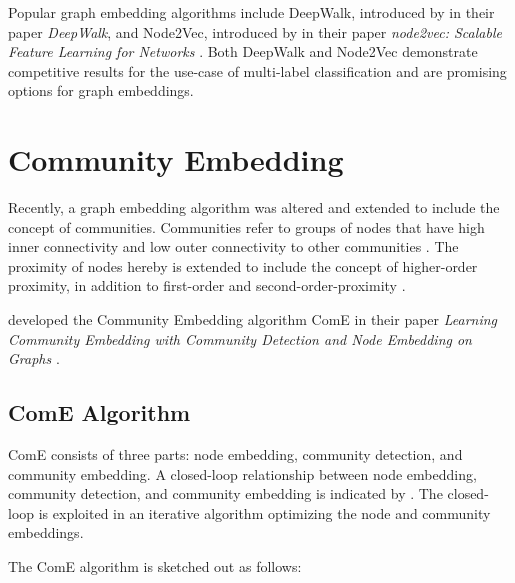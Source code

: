 \documentclass[conference]{IEEEtran}
\begin{document}
Popular graph embedding algorithms include DeepWalk, introduced by \citeauthor{Perozzi2014DeepWalkOL} in their \citeyear{Perozzi2014DeepWalkOL} paper \textit{DeepWalk}, and Node2Vec, introduced by \citeauthor{Grover2016node2vecSF} in their \citeyear{Grover2016node2vecSF} paper \textit{node2vec: Scalable Feature Learning for Networks} \cite{Perozzi2014DeepWalkOL, Grover2016node2vecSF}. Both DeepWalk and Node2Vec demonstrate competitive results for the use-case of multi-label classification and are promising options for graph embeddings.

\section{Community Embedding}

Recently, a graph embedding algorithm was altered and extended to include the concept of communities. Communities refer to groups of nodes that have high inner connectivity and low outer connectivity to other communities \cite{ComE}. The proximity of nodes hereby is extended to include the concept of higher-order proximity, in addition to first-order and second-order-proximity \cite{ComE}.

\citeauthor{ComE} developed the Community Embedding algorithm ComE in their \citeyear{ComE} paper \textit{Learning Community Embedding with Community Detection and Node Embedding on Graphs} \cite{ComE}.

\subsection{ComE Algorithm}
\label{sec:ComE_alg}

ComE consists of three parts: node embedding, community detection, and community embedding. A closed-loop relationship between node embedding, community detection, and community embedding is indicated by \citeauthor{ComE}. The closed-loop is exploited in an iterative algorithm optimizing the node and community embeddings.

The ComE algorithm is sketched out as follows:
\end{document}
